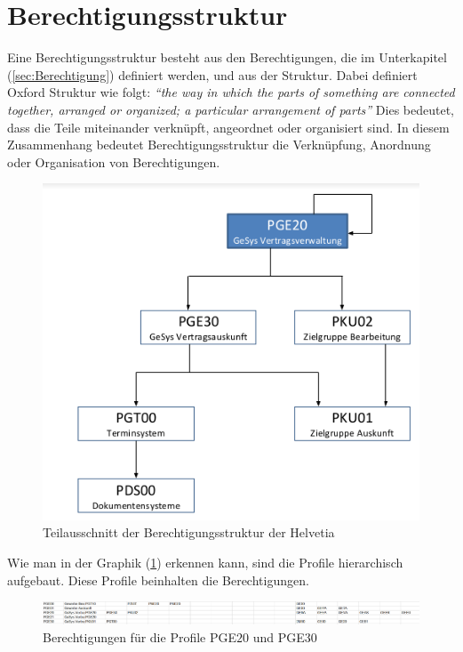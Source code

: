 \section{Berechtigungsstruktur}
\label{sec:Berechtigungsstruktur}
Eine Berechtigungsstruktur besteht aus den Berechtigungen, die im Unterkapitel (\ref{sec:Berechtigung}) definiert werden, und aus der Struktur.
Dabei definiert Oxford Struktur wie folgt:
\newline
\newline
\textit{"`the way in which the parts of something are connected together, arranged or organized; a particular arrangement of parts"'} \cite{Struct}
\newline
\newline
Dies bedeutet, dass die Teile miteinander verknüpft, angeordnet oder organisiert sind. \cite{Struct}
\newline
In diesem Zusammenhang bedeutet Berechtigungsstruktur die Verknüpfung, Anordnung oder Organisation von Berechtigungen.
\begin{figure}[h!]
 \centering
 \includegraphics[width=1\textwidth]{gfx/Picture/Struktur.PNG}
 \caption{Teilausschnitt der Berechtigungsstruktur der Helvetia}
 \label{fig:Teil}
\end{figure}
Wie man in der Graphik (\ref{fig:Teil}) erkennen kann, sind die Profile hierarchisch aufgebaut.
Diese Profile beinhalten die Berechtigungen.
\begin{figure}[h!]
\hspace*{-4cm}
 \centering
 \includegraphics[width=1.6\textwidth]{gfx/Picture/Ber.PNG}
 \caption{Berechtigungen für die Profile PGE$20$ und PGE$30$}
 \label{fig:Ber}
\end{figure}
